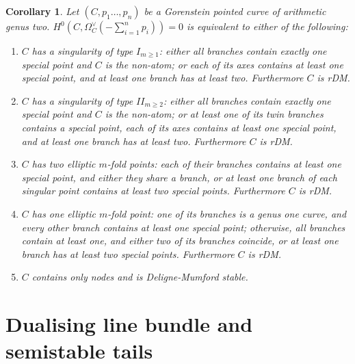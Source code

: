 \documentclass[11pt]{amsart}
\theoremstyle{plain}
\newtheorem{cor}[thm]{Corollary}
\theoremstyle{definition}
\begin{document}
\begin{cor}\label{cor:explicitnoaut}
 Let $(C,p_1\ldots,p_n)$ be a Gorenstein pointed curve of arithmetic genus two. $H^0(C,\Omega_C^\vee(-\sum_{i=1}^n p_i))=0$ is equivalent to either of the following:
 \begin{enumerate}[leftmargin=.6cm]
  \item $C$ has a singularity of type $I_{m\geq 1}$: either all branches contain exactly one special point and $C$ is the non-atom; or each of its axes contains at least one special point, and at least one branch has at least two. Furthermore $C$ is rDM.
  \item $C$ has a singularity of type $I\!I_{m\geq 2}$: either all branches contain exactly one special point and $C$ is the non-atom; or at least one of its twin branches contains a special point, each of its axes contains at least one special point, and at least one branch has at least two. Furthermore $C$ is rDM.
  \item $C$ has two elliptic $m$-fold points: each of their branches contains at least one special point, and either they share a branch, or at least one branch of each singular point contains at least two special points. Furthermore $C$ is rDM.
  \item $C$ has one elliptic $m$-fold point: one of its branches is a genus one curve, and every other branch contains at least one special point; otherwise, all branches contain at least one, and either two of its branches coincide, or at least one branch has at least two special points. Furthermore $C$ is rDM.
  \item $C$ contains only nodes and is Deligne-Mumford stable.
 \end{enumerate}
\end{cor}

\section{Dualising line bundle and semistable tails}\label{sec:sstails}
\end{document}
